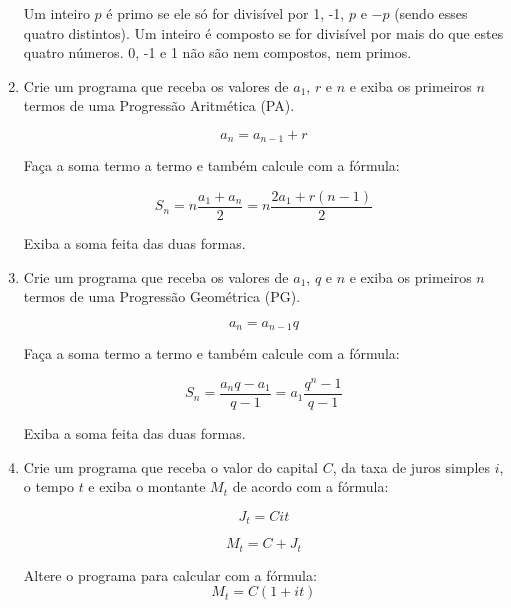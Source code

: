 \begin{enumerate}
	Um inteiro $p$ é primo se ele só for divisível por 1, -1, $p$ e $-p$ (sendo esses quatro distintos). 	
	Um inteiro é composto se for divisível por mais do que estes quatro números.
	0, -1 e 1 não são nem compostos, nem primos.
	

	

\quebra

	\item Crie um programa que 
	receba os valores de $a_1$, $r$ e $n$ 
	e exiba os primeiros $n$ termos de uma 
	Progressão Aritmética (PA).

	\begin{equation*}			
		a_n = a_{n-1} + r
	\end{equation*}	

	Faça a soma termo a termo e também calcule com a fórmula:

	\begin{equation*}
		S_n = n\frac{a_1 + a_n}{2} = n\frac{2 a_1 + r(n - 1)}{2}
	\end{equation*}

	Exiba a soma feita das duas formas.		

	\item Crie um programa que 
	receba os valores de $a_1$, $q$ e $n$
	e exiba os primeiros $n$ termos de uma 
	Progressão Geométrica (PG).

	\begin{equation*}
		a_n = a_{n-1} q
	\end{equation*}	

	Faça a soma termo a termo e também calcule com a fórmula:

	\begin{equation*}
		S_n = \frac{a_n q - a_1}{q - 1} = a_1 \frac{q^n - 1}{q - 1}
	\end{equation*}

	Exiba a soma feita das duas formas.


	\item Crie um programa que receba o valor do capital $C$, da taxa de juros simples $i$, o tempo $t$ e exiba o montante $M_t$ de acordo com a fórmula:
	\begin{multicols}{2}
		\begin{equation*}
			J_t = C i t
		\end{equation*}	

		\begin{equation*}
			M_t = C + J_t
		\end{equation*}	
	\end{multicols}
	Altere o programa para calcular com a fórmula:		
	\begin{equation*}
		M_t = C (1 + i t) 
	\end{equation*}
	

\end{enumerate}
